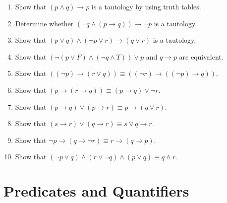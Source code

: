 \documentclass{sig-alternate-05-2015}
\begin{document}
\begin{enumerate}
\item Show that $(p \wedge q) \rightarrow p$ is a tautology
by using truth tables.

\item Determine whether $(\neg q \wedge (p \rightarrow q)) \rightarrow \neg p$ is a tautology.

\item Show that $(p \vee q) \wedge (\neg p \vee r) \rightarrow (q \vee r)$ is a tautology.

\item Show that $(\neg(p \vee F) \wedge (\neg q \wedge T)) \vee p$ and $q\rightarrow p$ are equivalent.

\item Show that $((\neg p) \rightarrow (r\vee q)) \equiv ((\neg r)\rightarrow ((\neg p)\rightarrow q))$.

\item Show that $(p \rightarrow (r \rightarrow q))\equiv (p \rightarrow q)\vee \neg r$.

\item Show that $(p \rightarrow q) \vee (p \rightarrow r) \equiv p \rightarrow (q\vee r)$.

\item Show that $(s \rightarrow r) \vee (q \rightarrow r) \equiv s\vee q \rightarrow  r$.

\item Show that $\neg p \rightarrow (q \rightarrow \neg r)\equiv r \rightarrow (q \rightarrow p)$.

\item Show that $(\neg p \vee q) \wedge (r \vee \neg q) \wedge (p \vee q) \equiv q\wedge r$.
\end{enumerate}

\section{Predicates and Quantifiers}
\end{document}
